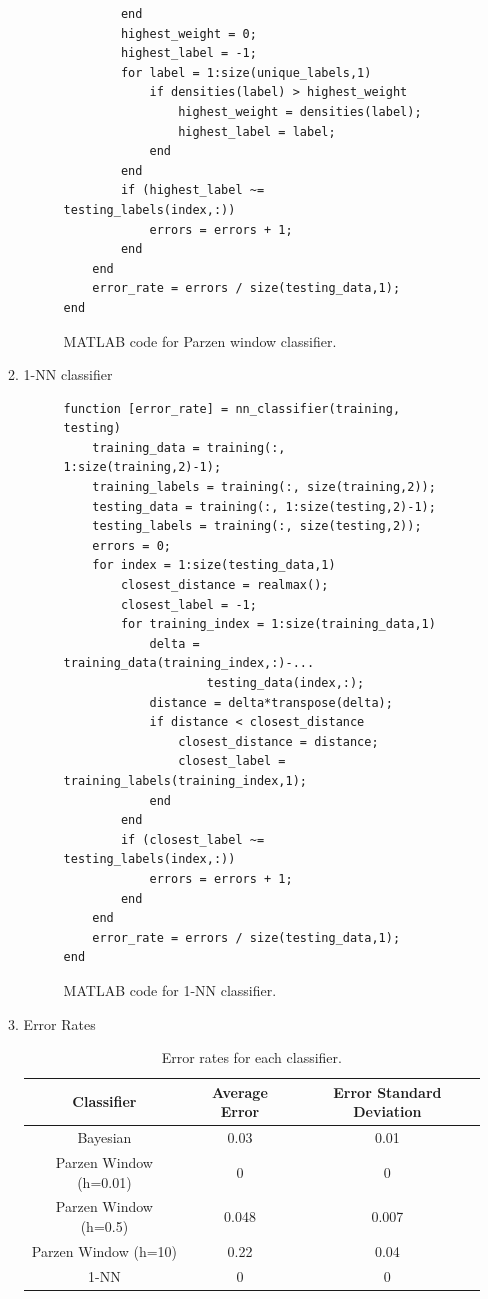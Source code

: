 \documentclass[12pt]{article}
\begin{document}
\begin{enumerate}
\begin{enumerate}
\begin{figure}[H]
\begin{verbatim}
        end
        highest_weight = 0;
        highest_label = -1;
        for label = 1:size(unique_labels,1)
            if densities(label) > highest_weight
                highest_weight = densities(label);
                highest_label = label;
            end
        end
        if (highest_label ~= testing_labels(index,:))
            errors = errors + 1;
        end
    end
    error_rate = errors / size(testing_data,1);    
end
\end{verbatim}
\caption{MATLAB code for Parzen window classifier.}
\end{figure}
\newpage
\item 1-NN classifier
\begin{figure}[H]
\begin{verbatim}
function [error_rate] = nn_classifier(training, testing)
    training_data = training(:, 1:size(training,2)-1);
    training_labels = training(:, size(training,2));
    testing_data = training(:, 1:size(testing,2)-1);
    testing_labels = training(:, size(testing,2));
    errors = 0;
    for index = 1:size(testing_data,1)
        closest_distance = realmax();
        closest_label = -1;
        for training_index = 1:size(training_data,1)
            delta = training_data(training_index,:)-...
                    testing_data(index,:);
            distance = delta*transpose(delta);
            if distance < closest_distance
                closest_distance = distance;
                closest_label = training_labels(training_index,1);
            end
        end
        if (closest_label ~= testing_labels(index,:))
            errors = errors + 1;
        end
    end
    error_rate = errors / size(testing_data,1);    
end
\end{verbatim}
\caption{MATLAB code for 1-NN classifier.}
\end{figure}
\item Error Rates
\begin{table}[H]
\begin{tabular}{ccc}
Classifier & Average Error & Error Standard Deviation \\ \hline
Bayesian & 0.03 & 0.01 \\
Parzen Window (h=0.01) & 0 & 0 \\
Parzen Window (h=0.5) & 0.048 & 0.007 \\
Parzen Window (h=10) & 0.22 & 0.04 \\
1-NN & 0 & 0 \\
\end{tabular}
\caption{Error rates for each classifier.}
\end{table}
\end{enumerate}
\end{enumerate}
\end{document}
